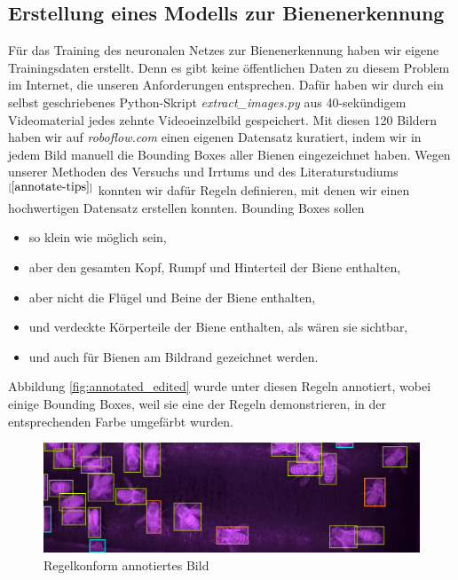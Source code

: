 \documentclass[11pt,a4paper]{article}
\newcommand{\bibRef}[1]{\hyperlink{#1}{$^{[\ref*{#1}{}]}$}}
\begin{document}
\subsection{Erstellung eines Modells zur Bienenerkennung}
Für das Training des neuronalen Netzes zur Bienenerkennung haben wir eigene Trainingsdaten erstellt. Denn es gibt keine öffentlichen Daten zu diesem Problem im Internet, die unseren Anforderungen entsprechen. Dafür haben wir durch ein selbst geschriebenes Python-Skript \textit{extract\_images.py} aus 40-sekündigem Videomaterial jedes zehnte Videoeinzelbild gespeichert. Mit diesen 120 Bildern haben wir auf \textit{roboflow.com} einen eigenen Datensatz kuratiert, indem wir in jedem Bild manuell die Bounding Boxes aller Bienen eingezeichnet haben. Wegen unserer Methoden des Versuchs und Irrtums und des Literaturstudiums\bibRef{annotate-tips} konnten wir dafür Regeln definieren, mit denen wir einen hochwertigen Datensatz erstellen konnten. Bounding Boxes sollen
\begin{itemize}
    \item[\textcolor{ora}{\textbullet}] so klein wie möglich sein,
    \item[\textcolor{ora}{\textbullet}] aber den gesamten Kopf, Rumpf und Hinterteil der Biene enthalten,
    \item[\textcolor{ora}{\textbullet}] aber nicht die Flügel und Beine der Biene enthalten,
    \item[\textcolor{pur}{\textbullet}] und verdeckte Körperteile der Biene enthalten, als wären sie sichtbar,
    \item[\textcolor{blu}{\textbullet}] und auch für Bienen am Bildrand gezeichnet werden.
\end{itemize}
Abbildung \autoref{fig:annotated_edited} wurde unter diesen Regeln annotiert, wobei einige Bounding Boxes, weil sie eine der Regeln demonstrieren, in der entsprechenden Farbe umgefärbt wurden.
\begin{figure}[H]
    \centering
    \includegraphics[width = .8\textwidth]{images/annotated_edited.png}
    \caption{Regelkonform annotiertes Bild}
    \label{fig:annotated_edited}
\end{figure}
\end{document}
